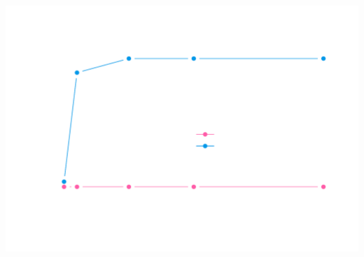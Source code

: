 \documentclass{article}\usepackage[]{graphicx}\usepackage[]{color}
\newenvironment{knitrout}{}{} %
\begin{document}
\begin{knitrout}
\includegraphics[width=\textwidth]{figure/resultsdynhet-4} 

\end{knitrout}
\end{document}
